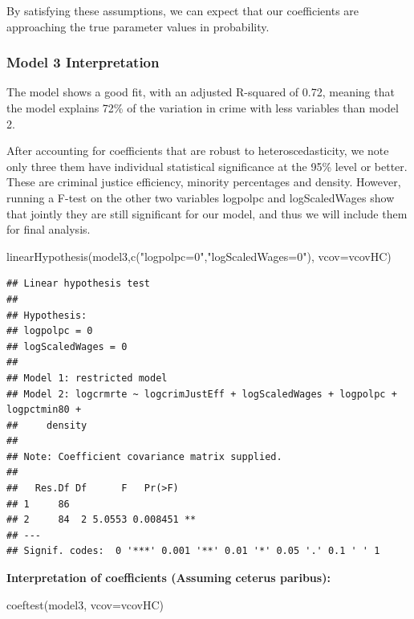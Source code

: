 \documentclass[]{article}
\newenvironment{Shaded}{}{}
\newcommand{\DataTypeTok}[1]{#1}
\newcommand{\KeywordTok}[1]{\textcolor[rgb]{0.00,0.00,1.00}{#1}}
\newcommand{\NormalTok}[1]{#1}
\newcommand{\StringTok}[1]{\textcolor[rgb]{0.00,0.50,0.50}{#1}}
\begin{document}
By satisfying these assumptions, we can expect that our coefficients are
approaching the true parameter values in probability.

\hypertarget{model-3-interpretation}{%
\subsubsection{Model 3 Interpretation}\label{model-3-interpretation}}

The model shows a good fit, with an adjusted R-squared of 0.72, meaning
that the model explains 72\% of the variation in crime with less
variables than model 2.

After accounting for coefficients that are robust to heteroscedasticity,
we note only three them have individual statistical significance at the
95\% level or better. These are criminal justice efficiency, minority
percentages and density. However, running a F-test on the other two
variables logpolpc and logScaledWages show that jointly they are still
significant for our model, and thus we will include them for final
analysis.

\begin{Shaded}
\begin{Highlighting}[]
\KeywordTok{linearHypothesis}\NormalTok{(model3,}\KeywordTok{c}\NormalTok{(}\StringTok{"logpolpc=0"}\NormalTok{,}\StringTok{"logScaledWages=0"}\NormalTok{), }\DataTypeTok{vcov=}\NormalTok{vcovHC)}
\end{Highlighting}
\end{Shaded}

\begin{verbatim}
## Linear hypothesis test
## 
## Hypothesis:
## logpolpc = 0
## logScaledWages = 0
## 
## Model 1: restricted model
## Model 2: logcrmrte ~ logcrimJustEff + logScaledWages + logpolpc + logpctmin80 + 
##     density
## 
## Note: Coefficient covariance matrix supplied.
## 
##   Res.Df Df      F   Pr(>F)   
## 1     86                      
## 2     84  2 5.0553 0.008451 **
## ---
## Signif. codes:  0 '***' 0.001 '**' 0.01 '*' 0.05 '.' 0.1 ' ' 1
\end{verbatim}

\textbf{Interpretation of coefficients (Assuming ceterus paribus):}

\begin{Shaded}
\begin{Highlighting}[]
\KeywordTok{coeftest}\NormalTok{(model3, }\DataTypeTok{vcov=}\NormalTok{vcovHC)}
\end{Highlighting}
\end{Shaded}
\end{document}
